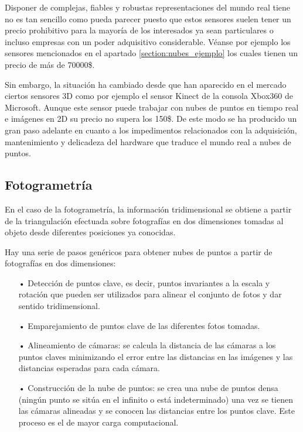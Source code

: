 Disponer de complejas, fiables y robustas representaciones del mundo real tiene no es tan sencillo como pueda parecer puesto que estos sensores suelen tener un precio prohibitivo para la mayoría de los interesados ya sean particulares o incluso empresas con un poder adquisitivo considerable. Véanse por ejemplo los sensores mencionados en el apartado \ref{section:nubes_ejemplo} los cuales tienen un precio de más de 70000\$.

Sin embargo, la situación ha cambiado desde que han aparecido en el mercado ciertos sensores 3D como por ejemplo el sensor Kinect de la consola Xbox360 de Microsoft\cite{kinect}. Aunque este sensor puede trabajar con nubes de puntos en tiempo real e imágenes en 2D su precio no supera los 150\$. De este modo se ha producido un gran paso adelante en cuanto a los impedimentos relacionados con la adquisición, mantenimiento y delicadeza del hardware que traduce el mundo real a nubes de puntos.

\fi
\subsection{Fotogrametría}
En el caso de la fotogrametría\cite{fotogrametria}, la información tridimensional se obtiene a partir de la triangulación efectuada sobre fotografías en dos dimensiones tomadas al objeto desde diferentes posiciones ya conocidas.

Hay una serie de pasos genéricos para obtener nubes de puntos a partir de fotografías en dos dimensiones:
\begin{itemize}
\item[•] Detección de puntos clave, es decir, puntos invariantes a la escala y rotación que pueden ser utilizados para alinear el conjunto de fotos y dar sentido tridimensional.
\item[•] Emparejamiento de puntos clave de las diferentes fotos tomadas.
\item[•] Alineamiento de cámaras: se calcula la distancia de las cámaras a los puntos claves minimizando el error entre las distancias en las imágenes y las distancias esperadas para cada cámara.
\item[•] Construcción de la nube de puntos: se crea una nube de puntos densa (ningún punto se sitúa en el infinito o está indeterminado) una vez se tienen las cámaras alineadas y se conocen las distancias entre los puntos clave. Este proceso es el de mayor carga computacional.
\end{itemize}

